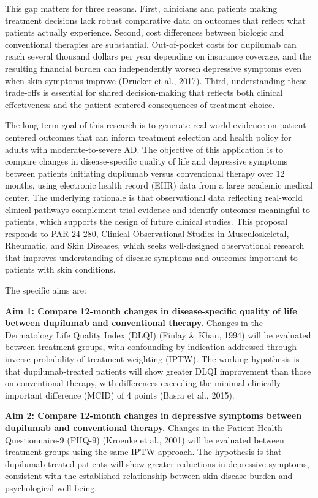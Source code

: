 \documentclass[
]{agujournal2019}
\begin{document}
This gap matters for three reasons. First, clinicians and patients
making treatment decisions lack robust comparative data on outcomes that
reflect what patients actually experience. Second, cost differences
between biologic and conventional therapies are substantial.
Out-of-pocket costs for dupilumab can reach several thousand dollars per
year depending on insurance coverage, and the resulting financial burden
can independently worsen depressive symptoms even when skin symptoms
improve (Drucker et al., 2017). Third, understanding these trade-offs is
essential for shared decision-making that reflects both clinical
effectiveness and the patient-centered consequences of treatment choice.

The long-term goal of this research is to generate real-world evidence
on patient-centered outcomes that can inform treatment selection and
health policy for adults with moderate-to-severe AD. The objective of
this application is to compare changes in disease-specific quality of
life and depressive symptoms between patients initiating dupilumab
versus conventional therapy over 12 months, using electronic health
record (EHR) data from a large academic medical center. The underlying
rationale is that observational data reflecting real-world clinical
pathways complement trial evidence and identify outcomes meaningful to
patients, which supports the design of future clinical studies. This
proposal responds to PAR-24-280, Clinical Observational Studies in
Musculoskeletal, Rheumatic, and Skin Diseases, which seeks well-designed
observational research that improves understanding of disease symptoms
and outcomes important to patients with skin conditions.

The specific aims are:

\textbf{Aim 1: Compare 12-month changes in disease-specific quality of
life between dupilumab and conventional therapy.} Changes in the
Dermatology Life Quality Index (DLQI) (Finlay \& Khan, 1994) will be
evaluated between treatment groups, with confounding by indication
addressed through inverse probability of treatment weighting (IPTW). The
working hypothesis is that dupilumab-treated patients will show greater
DLQI improvement than those on conventional therapy, with differences
exceeding the minimal clinically important difference (MCID) of 4 points
(Basra et al., 2015).

\textbf{Aim 2: Compare 12-month changes in depressive symptoms between
dupilumab and conventional therapy.} Changes in the Patient Health
Questionnaire-9 (PHQ-9) (Kroenke et al., 2001) will be evaluated between
treatment groups using the same IPTW approach. The hypothesis is that
dupilumab-treated patients will show greater reductions in depressive
symptoms, consistent with the established relationship between skin
disease burden and psychological well-being.
\end{document}

